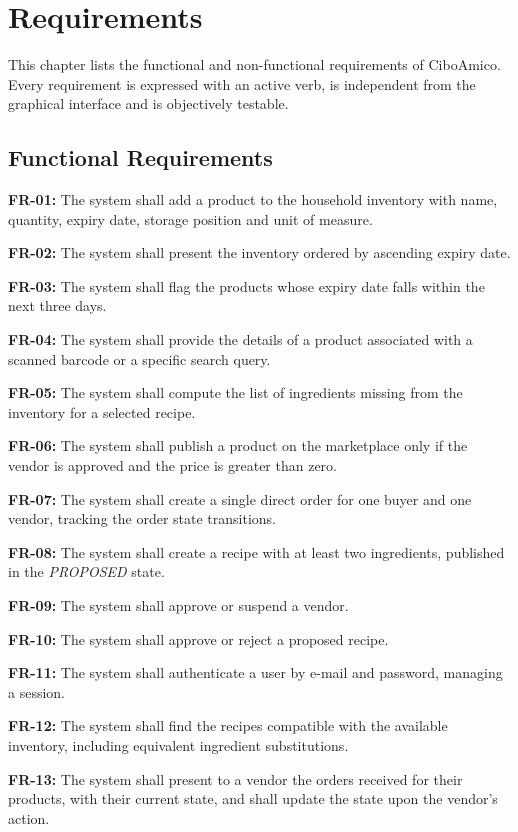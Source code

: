 \chapter{Requirements}\label{ch:requirements}

This chapter lists the functional and non-functional requirements of
CiboAmico. Every requirement is expressed with an active verb, is independent
from the graphical interface and is objectively testable.

\section{Functional Requirements}

\begin{reqs}
    \item \textbf{FR-01:} The system shall add a product to the household
    inventory with name, quantity, expiry date, storage position and unit of
    measure.
    \item \textbf{FR-02:} The system shall present the inventory ordered by
    ascending expiry date.
    \item \textbf{FR-03:} The system shall flag the products whose expiry date
    falls within the next three days.
    \item \textbf{FR-04:} The system shall provide the details of a product
    associated with a scanned barcode or a specific search query.
    \item \textbf{FR-05:} The system shall compute the list of ingredients
    missing from the inventory for a selected recipe.
    \item \textbf{FR-06:} The system shall publish a product on the
    marketplace only if the vendor is approved and the price is greater than
    zero.
    \item \textbf{FR-07:} The system shall create a single direct order for
    one buyer and one vendor, tracking the order state transitions.
    \item \textbf{FR-08:} The system shall create a recipe with at least two
    ingredients, published in the \emph{PROPOSED} state.
    \item \textbf{FR-09:} The system shall approve or suspend a vendor.
    \item \textbf{FR-10:} The system shall approve or reject a proposed
    recipe.
    \item \textbf{FR-11:} The system shall authenticate a user by e-mail and
    password, managing a session.
    \item \textbf{FR-12:} The system shall find the recipes compatible with the
    available inventory, including equivalent ingredient substitutions.
    \item \textbf{FR-13:} The system shall present to a vendor the orders
    received for their products, with their current state, and shall update
    the state upon the vendor's action.
\end{reqs}

